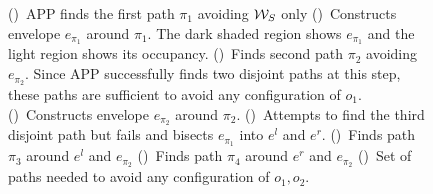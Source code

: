 \documentclass[a4paper]{report}
\begin{document}
\begin{figure}[t]
{     ()~APP finds the first path $\pi_1$ avoiding $\mathcal{W}_S$ only
    ()~Constructs envelope $e_{\pi_1}$ around $\pi_1$. The dark shaded region shows $e_{\pi_1}$ and the light region shows its occupancy.
    ()~Finds second path $\pi_2$ avoiding $e_{\pi_2}$. Since APP successfully finds two disjoint paths at this step, these paths are sufficient to avoid any configuration of $o_1$.
    ()~Constructs envelope $e_{\pi_2}$ around $\pi_2$.
    ()~Attempts to find the third disjoint path but fails and bisects $e_{\pi_1}$ into $e^l$ and $e^r$.
    ()~Finds path $\pi_3$ around $e^l$ and $e_{\pi_2}$
    ()~Finds path $\pi_4$ around $e^r$ and $e_{\pi_2}$ 
    ()~Set of paths needed to avoid any configuration of $o_1,o_2$.
    }
    
    \label{fig:illustration}
\end{figure}
\end{document}
